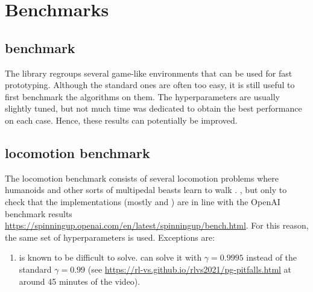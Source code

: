 \chapter{Benchmarks}

\section{\gym benchmark}

The \gym library regroups several game-like environments that can be used for fast prototyping. Although the standard ones are often too easy, it is still useful to first benchmark the algorithms on them. The hyperparameters are usually slightly tuned, but not much time was dedicated to obtain the best performance on each case. Hence, these results can potentially be improved.



\section{\mujoco locomotion benchmark}

The \mujoco locomotion benchmark consists of several locomotion problems where humanoids and other sorts of multipedal beasts learn to walk \cite{mujoco}. , but only to check that the implementations (mostly \tdt and \sac) are in line with the OpenAI benchmark results \url{https://spinningup.openai.com/en/latest/spinningup/bench.html}. For this reason, the same set of hyperparameters is used. Exceptions are:

\begin{enumerate}
	\item {} is known to be difficult to solve. \ppo can solve it with $\gamma = 0.9995$ instead of the standard $\gamma = 0.99$ (see \url{https://rl-vs.github.io/rlvs2021/pg-pitfalls.html} at around 45 minutes of the video).
\end{enumerate}

